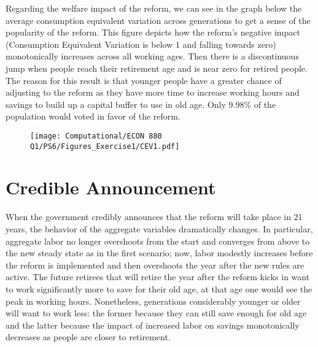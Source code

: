 \documentclass[12pt]{article}
\begin{document}
\begin{figure}[hbt!]
    \centering
    \vspace{1cm}
\end{figure}
\newpage

Regarding the welfare impact of the reform, we can see in the graph below the average consumption equivalent variation across generations to get a sense of the popularity of the reform. This figure depicts how the reform's negative impact (Consumption Equivalent Variation is below 1 and falling towards zero) monotonically increases across all working ages. Then there is a discontinuous jump when people reach their retirement age and is near zero for retired people. The reason for this result is that younger people have a greater chance of adjusting to the reform as they have more time to increase working hours and savings to build up a capital buffer to use in old age. Only 9.98\% of the population would voted in favor of the reform.

\begin{figure}[hbt!]
    \centering
\texttt{[image: Computational/ECON 880 Q1/PS6/Figures\_Exercise1/CEV1.pdf]}
\end{figure}

\newpage

\section{Credible Announcement}
When the government credibly announces that the reform will take place in 21 years, the behavior of the aggregate variables dramatically changes. In particular, aggregate labor no longer overshoots from the start and converges from above to the new steady state as in the first scenario; now, labor modestly increases before the reform is implemented and then overshoots the year after the new rules are active. The future retirees that will retire the year after the reform kicks in want to work significantly more to save for their old age, at that age one would see the peak in working hours. Nonetheless, generations considerably younger or older will want to work less: the former because they can still save enough for old age and the latter because the impact of increased labor on savings monotonically decreases as people are closer to retirement.
\end{document}

